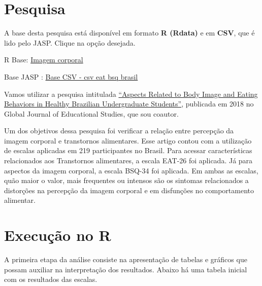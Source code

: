 \documentclass[
]{book}
\newenvironment{Shaded}{\begin{snugshade}}{\end{snugshade}}
\newcommand{\DataTypeTok}[1]{\textcolor[rgb]{0.13,0.29,0.53}{#1}}
\newcommand{\KeywordTok}[1]{\textcolor[rgb]{0.13,0.29,0.53}{\textbf{#1}}}
\newcommand{\NormalTok}[1]{#1}
\newcommand{\OperatorTok}[1]{\textcolor[rgb]{0.81,0.36,0.00}{\textbf{#1}}}
\newcommand{\OtherTok}[1]{\textcolor[rgb]{0.56,0.35,0.01}{#1}}
\newcommand{\StringTok}[1]{\textcolor[rgb]{0.31,0.60,0.02}{#1}}
\begin{document}
\hypertarget{pesquisa-8}{%
\section{Pesquisa}\label{pesquisa-8}}

A base desta pesquisa está disponível em formato \textbf{R (Rdata)} e em \textbf{CSV}, que é lido pelo JASP. Clique na opção desejada.

R Base: \href{https://github.com/anovabr/mqt/raw/master/bases/Base\%20R\%20-\%20imagem\%20corporal.RData}{Imagem corporal}

Base JASP : \href{https://github.com/anovabr/mqt/raw/master/bases/bases_csv_jasp.zip}{Base CSV - csv eat bsq brasil}

Vamos utilizar a pesquisa intitulada \href{https://www.researchgate.net/publication/323729370_Aspects_Related_to_Body_Image_and_Eating_Behaviors_in_Healthy_Brazilian_Undergraduate_Students}{``Aspects Related to Body Image and Eating Behaviors in Healthy Brazilian Undergraduate Students''}, publicada em 2018 no Global Journal of Educational Studies, que sou coautor.

Um dos objetivos dessa pesquisa foi verificar a relação entre percepção da imagem corporal e transtornos alimentares. Esse artigo contou com a utilização de escalas aplicadas em 219 participantes no Brasil. Para acessar características relacionados aos Transtornos alimentares, a escala EAT-26 foi aplicada. Já para aspectos da imagem corporal, a escala BSQ-34 foi aplicada. Em ambas as escalas, quão maior o valor, mais frequentes ou intensos são os sintomas relacionados a distorções na percepção da imagem corporal e em disfunções no comportamento alimentar.

\hypertarget{execuuxe7uxe3o-no-r-13}{%
\section{Execução no R}\label{execuuxe7uxe3o-no-r-13}}

A primeira etapa da análise consiste na apresentação de tabelas e gráficos que possam auxiliar na interpretação dos resultados. Abaixo há uma tabela inicial com os resultados das escalas.

\begin{Shaded}
\end{Shaded}
\end{document}
